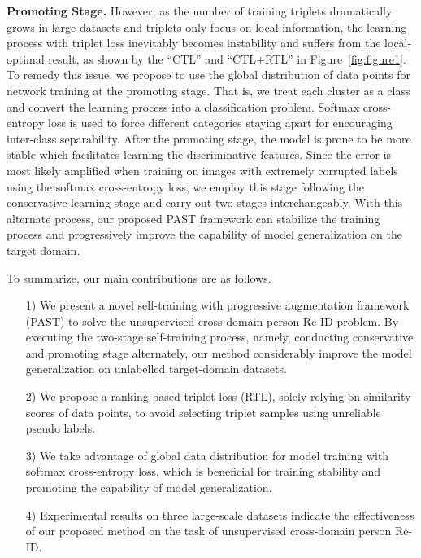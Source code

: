 \documentclass[10pt,twocolumn,letterpaper]{article}
\begin{document}
\noindent\textbf{Promoting Stage.}
However, as the number of training triplets dramatically grows in large datasets and triplets only focus on local information, the learning process with triplet loss inevitably becomes instability and suffers from the local-optimal result, as shown by the ``CTL'' and ``CTL+RTL'' in Figure~\ref{fig:figure1}.
To remedy this issue, we propose to use the global distribution of data points for network training at the promoting stage.
That is, we treat each cluster as a class and convert the learning process into a classification problem. Softmax cross-entropy loss is used to force different categories staying apart for encouraging inter-class separability. After the promoting stage, the model is prone to be more stable which facilitates learning the discriminative features.
Since the error is most likely amplified when training on images with extremely corrupted labels using the softmax cross-entropy loss, we employ this stage following the conservative learning stage and carry out two stages interchangeably. With this alternate process, our proposed PAST framework can stabilize the training process and progressively improve the capability of model generalization on the target domain. 

To summarize, our main contributions are as follows.
\begin{itemize}[fullwidth, itemindent=1em]
\item[1)] We present a novel self-training with progressive augmentation framework (PAST) to solve the unsupervised cross-domain person Re-ID problem. By executing the two-stage self-training process, namely,
conducting conservative and promoting stage alternately, our method considerably improve the model generalization on unlabelled target-domain datasets.
\item[2)] We propose a ranking-based triplet loss (RTL), solely relying on similarity scores of data points, to avoid selecting triplet samples using unreliable pseudo labels.
\item[3)] We take advantage of global data distribution for model training with softmax cross-entropy loss, which is  beneficial for training stability and promoting the capability of model generalization.
\item[4)]  Experimental results on three large-scale datasets indicate the effectiveness of our proposed method on the task of unsupervised cross-domain person Re-ID.
\end{itemize}
\end{document}
